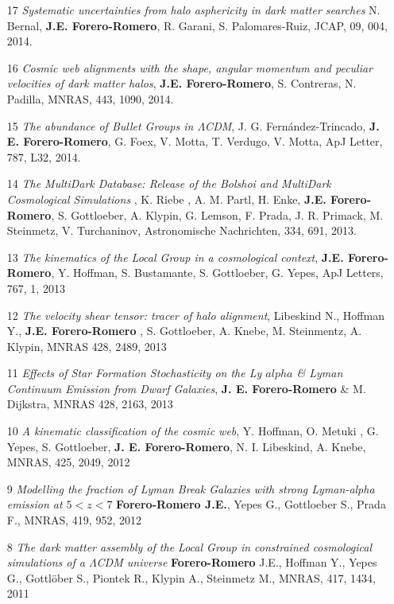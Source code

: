 \documentclass[letterpaper,11pt,onecolumn]{article}
\begin{document}
\begin{enumerate}
\item[17]{\it Systematic uncertainties from halo asphericity in dark
  matter searches}  N. Bernal, {\bf J.E. Forero-Romero}, R. Garani,
  S. Palomares-Ruiz, JCAP, 09, 004, 2014.

\item[16]{\it Cosmic web alignments with the shape, angular momentum
  and peculiar velocities of dark matter halos}, 
  {\bf J.E. Forero-Romero}, S. Contreras, N. Padilla, MNRAS, 443,
  1090, 2014. 

\item[15]{\it The abundance of Bullet Groups in $\Lambda$CDM},
  J. G. Fern\'andez-Trincado, {\bf J. E. Forero-Romero}, G. Foex,
  V. Motta, T. Verdugo, V. Motta, ApJ Letter, 787, L32, 2014.

\item[14]{\it The MultiDark Database: Release of the Bolshoi and
  MultiDark Cosmological Simulations} , K. Riebe , A. M. Partl,
  H. Enke, {\bf J.E. Forero-Romero}, S. Gottloeber, A. Klypin,
  G. Lemson, F. Prada, J. R. Primack, M. Steinmetz, V. Turchaninov,
  Astronomische Nachrichten, 334, 691, 2013. 

\item[13] {\it The kinematics of the Local Group in a cosmological context}, 
{\bf J.E. Forero-Romero}, Y. Hoffman, S. Bustamante, S. Gottloeber,
G. Yepes, ApJ Letters, 767, 1, 2013 


\item[12] {\it The velocity shear tensor: tracer of halo alignment},
  Libeskind N., Hoffman Y., {\bf J.E. Forero-Romero} , S. Gottloeber,
  A. Knebe, M. Steinmentz, A. Klypin, MNRAS 428, 2489, 2013 

\item[11] {\it Effects of Star Formation Stochasticity on the Ly
  $alpha$ \& Lyman Continuum Emission from Dwarf Galaxies}, {\bf
  J. E. Forero-Romero} \& M. Dijkstra, MNRAS 428, 2163, 2013 

\item[10] {\it A kinematic classification of the cosmic web},
  Y. Hoffman, O. Metuki , G. Yepes, S. Gottloeber, {\bf
    J. E. Forero-Romero}, N. I. Libeskind, A. Knebe, MNRAS, 425, 2049,
  2012 

\item[9] {\it Modelling the fraction of Lyman Break Galaxies with
  strong Lyman-alpha emission at $5 < z < 7$} {\bf Forero-Romero
  J.E.}, Yepes G., Gottloeber S., Prada F., MNRAS, 419, 952, 2012 

\item [8]
{\it The dark matter assembly of the Local Group in constrained cosmological
  simulations of a $\Lambda$CDM universe} {\bf Forero-Romero} J.E.,
Hoffman Y., Yepes G., Gottl\"ober S., Piontek R., Klypin A., Steinmetz
M.,  MNRAS, 417, 1434, 2011 


\end{enumerate}
\end{document}
